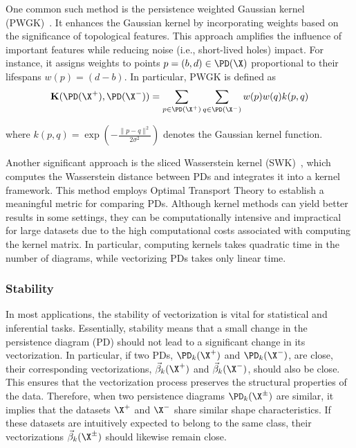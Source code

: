 One common such method is the persistence weighted Gaussian kernel (PWGK)~\cite{kusano2016persistence}. It enhances the Gaussian kernel by incorporating weights based on the significance of topological features. This approach amplifies the influence of important features while reducing noise (i.e., short-lived holes) impact. For instance, it assigns weights to points $p=(b,d)\in\PD(\X)$ proportional to their lifespans $w(p)=(d-b)$. In particular, PWGK is defined as
\[ 
\mathbf{K}(\PD(\X^+), \PD(\X^-)) = \sum_{p \in \PD(\X^+)} \sum_{q \in \PD(\X^-)} w(p) w(q) k(p, q)
\]

where $k(p, q) = \exp\left(-\frac{\|p - q\|^2}{2\sigma^2}\right)$ denotes the Gaussian kernel function.

Another significant approach is the sliced Wasserstein kernel (SWK)~\cite{carriere2017sliced}, which computes the Wasserstein distance between PDs and integrates it into a kernel framework. This method employs Optimal Transport Theory to establish a meaningful metric for comparing PDs. Although kernel methods can yield better results in some settings, they can be computationally intensive and impractical for large datasets due to the high computational costs associated with computing the kernel matrix. In particular, computing kernels takes quadratic time in the number of diagrams, while vectorizing PDs takes only linear time.



\subsubsection{Stability} In most applications, the stability of vectorization is vital for statistical and inferential tasks. Essentially, stability means that a small change in the persistence diagram (PD) should not lead to a significant change in its vectorization. In particular, if two PDs, $\PD_k(\X^+)$ and $\PD_k(\X^-)$, are close, their corresponding vectorizations, $\vec{\beta}_k(\X^+)$ and $\vec{\beta}_k(\X^-)$, should also be close. This ensures that the vectorization process preserves the structural properties of the data. Therefore, when two persistence diagrams $\PD_k(\X^\pm)$ are similar, it implies that the datasets $\X^+$ and $\X^-$ share similar shape characteristics. If these datasets are intuitively expected to belong to the same class, their vectorizations $\vec{\beta}_k(\X^\pm)$ should likewise remain close.

